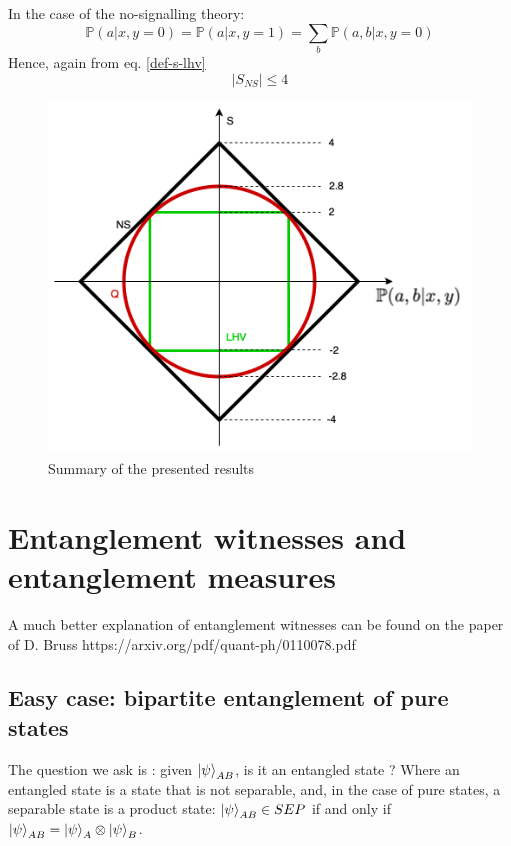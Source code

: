 \documentclass{article}
\begin{document}
In the case of the no-signalling theory:
\begin{equation}
    \mathbb{P}(a|x,y=0) = \mathbb{P}(a|x, y=1) = \sum_b \mathbb{P}(a,b|x,y=0)
\end{equation}
Hence, again from eq. \ref{def-s-lhv}
\begin{equation}
    |S_{NS}| \leq 4
\end{equation}

\begin{figure}[h]
    \centering
    \includegraphics[scale=0.25]{s-recap.png}
    \caption{Summary of the presented results}
\end{figure}


\newpage
\section{Entanglement witnesses and entanglement measures}
A much better explanation of entanglement witnesses can be found on the paper of
D. Bruss https://arxiv.org/pdf/quant-ph/0110078.pdf
\subsection{Easy case: bipartite entanglement of pure states}
The question we ask is : given $\ket{\psi}_{AB}$, is it an entangled state ?
Where an entangled state is a state that is not separable, and, in the case of
pure states, a separable state is a product state: $\ket{\psi}_{AB} \in SEP$ if
and only if $\ket{\psi}_{AB} = \ket{\psi}_A \otimes \ket{\psi}_B$.
\end{document}
